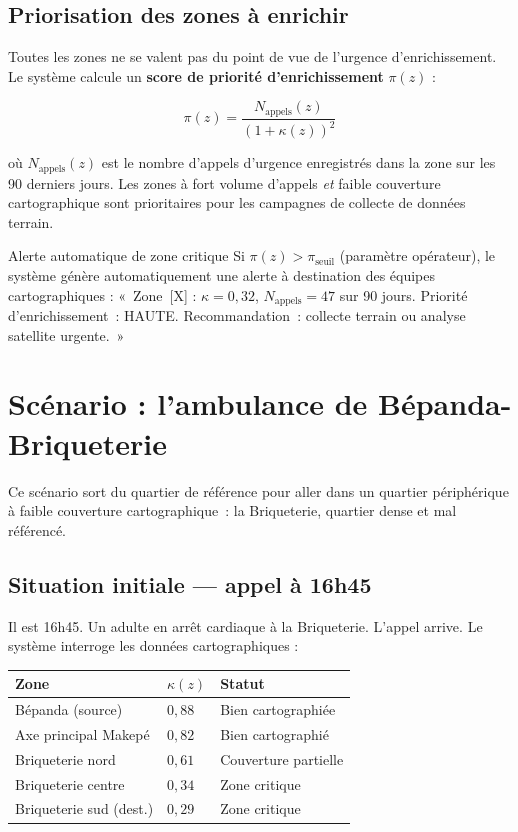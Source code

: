 \documentclass[12pt,a4paper]{article}
\theoremstyle{definition}
\theoremstyle{remark}
\begin{document}
\subsection{Priorisation des zones à enrichir}

Toutes les zones ne se valent pas du point de vue de l'urgence d'enrichissement.
Le système calcule un \textbf{score de priorité d'enrichissement} $\pi(z)$ :

\[
  \pi(z) = \frac{N_\text{appels}(z)}{(1 + \kappa(z))^2}
\]

où $N_\text{appels}(z)$ est le nombre d'appels d'urgence enregistrés
dans la zone sur les 90 derniers jours. Les zones à fort volume d'appels
\emph{et} faible couverture cartographique sont prioritaires pour
les campagnes de collecte de données terrain.

\begin{alertbox}{Alerte automatique de zone critique}
Si $\pi(z) > \pi_\text{seuil}$ (paramètre opérateur), le système
génère automatiquement une alerte à destination des équipes cartographiques :
«~Zone~[X] : $\kappa = 0{,}32$, $N_\text{appels} = 47$ sur 90 jours.
Priorité d'enrichissement~: HAUTE. Recommandation~: collecte terrain
ou analyse satellite urgente.~»
\end{alertbox}

\newpage

\section{Scénario : l'ambulance de Bépanda-Briqueterie}

Ce scénario sort du quartier de référence pour aller dans un quartier
périphérique à faible couverture cartographique~: la Briqueterie,
quartier dense et mal référencé.

\subsection{Situation initiale --- appel à 16h45}

Il est 16h45. Un adulte en arrêt cardiaque à la Briqueterie.
L'appel arrive. Le système interroge les données cartographiques :

\begin{center}
\begin{tabular}{lll}
  \toprule
  \textbf{Zone} & $\kappa(z)$ & \textbf{Statut} \\
  \midrule
  Bépanda (source)          & $0{,}88$ & Bien cartographiée \\
  Axe principal Makepé      & $0{,}82$ & Bien cartographié \\
  Briqueterie nord          & $0{,}61$ & Couverture partielle \\
  Briqueterie centre        & $0{,}34$ & Zone critique \\
  Briqueterie sud (dest.)   & $0{,}29$ & Zone critique \\
  \bottomrule
\end{tabular}
\end{center}
\end{document}
